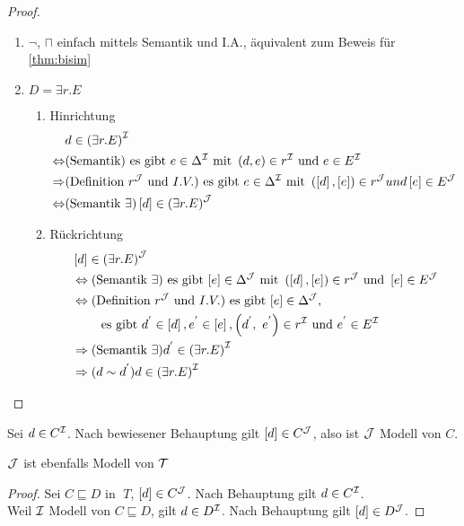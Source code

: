 \begin{tafel}
\begin{proof}
\begin{enumerate}
    \item $\neg$, $\sqcap$ einfach mittels Semantik und I.A., äquivalent zum Beweis für \autoref{thm:bisim}
\item $D = \exists r.E$
  \begin{enumerate}
  \def\labelenumi{\alph{enumi}.}
  \def\labelenumii{\alph{enumii}.}
  \item Hinrichtung
      \begin{align*}
          &d \in \left( \exists r.E \right)^{\mathcal{I}}\\
          \Leftrightarrow &(\text{Semantik})\text{ es gibt }e \in \Delta^{\mathcal{I}} \text{ mit } \left( d,e \right) \in r^{\mathcal{I}} \text{ und } e \in E^{\mathcal{I}} \\
          \Rightarrow &(\text{Definition }r^{\mathcal{J}} \text{ und } I.V.) \text{ es gibt }e \in \Delta^{\mathcal{I}} \text{ mit }\left( \left\lbrack d \right\rbrack,\left\lbrack e \right\rbrack \right) \in r^{\mathcal{J}} und \left\lbrack e \right\rbrack \in E^{\mathcal{J}} \\
          \Leftrightarrow &(\text{Semantik } \exists) \left\lbrack d \right\rbrack \in \left( \exists r.E \right)^{\mathcal{J}}
      \end{align*}
    \item Rückrichtung
        \begin{align*}
            &\left\lbrack d \right\rbrack \in \left( \exists r.E \right)^{\MJ} \\
            &\Leftrightarrow (\text{Semantik }\exists) \text{ es gibt }[e] \in \Delta^{\MJ} \text{ mit } \left( \left\lbrack d \right\rbrack,\left\lbrack e \right\rbrack \right) \in r^{\MJ}\text{ und }\left\lbrack e \right\rbrack \in E^{\MJ} \\
            &\Leftrightarrow (\text{Definition }r^{\MJ} \text{ und }I.V.) \text{ es gibt }[e] \in \Delta^{\MJ},\\
            &\quad\quad\text{ es gibt }d^{'} \in \left\lbrack d \right\rbrack, e^{'} \in \left\lbrack e \right\rbrack, \left( d^{'},\ e^{'} \right) \in r^{\MI} \text{ und }e^{'} \in E^{\MI} \\
            &\Rightarrow (\text{Semantik }\exists) d^{'} \in \left( \exists r.E \right)^{\MI} \\
            &\Rightarrow (d \sim d^{'}) d \in \left( \exists r.E \right)^{\MI}
        \end{align*}
\end{enumerate}
\end{enumerate}
\end{proof}
Sei $d \in C^{\mathcal{I}}$. Nach bewiesener Behauptung gilt $[d] \in C^{\mathcal{J}}$, also ist $\mathcal{J}$ Modell von $C$.

$\mathcal{J}$ ist ebenfalls Modell von $\mathcal{T}$
\begin{proof}
Sei $C \sqsubseteq D$ in $\;T$, $[d] \in C^{\mathcal{J}}$.
Nach Behauptung gilt $d \in C^{\mathcal{I}}$. \\
Weil $\mathcal{I}$ Modell von $C \sqsubseteq D$, gilt $d \in D^{\mathcal{I}}$.
Nach Behauptung gilt $[d] \in D^{\mathcal{J}}$.
\end{proof}
\end{tafel}

